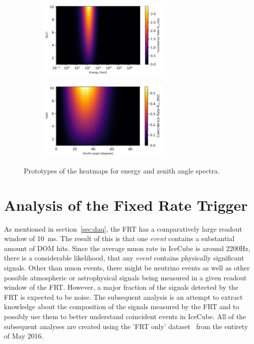 \begin{figure}[ht]
    \centering
    \begin{subfigure}[b]{\textwidth}
        \centering
        \includegraphics[width=0.7\textwidth]{Plots/heatmap_energy.png}
    \end{subfigure}
    \vspace{1em} %
    \begin{subfigure}[b]{\textwidth}
        \centering
        \includegraphics[width=0.7\textwidth]{Plots/heatmap_zenith.png}
    \end{subfigure}
    \caption{Prototypes of the heatmaps for energy and zenith angle spectra.}
    \label{fig:heatmaps_combined}
\end{figure}

\section{Analysis of the Fixed Rate Trigger}

As mentioned in section~\ref{sec:daq}, the FRT has a comparatively large readout window of \SI{10}{ms}. The result of this is that one \textit{event} contains 
a substantial amount of DOM hits. Since the average muon rate in IceCube is around \num{2200}\unit{Hz}, there is a considerable likelihood, that any \textit{event}
contains physically significant signals. Other than muon events, there might be neutrino events as well as other possible atmospheric or astrophysical signals 
being measured in a given readout window of the FRT. However, a major fraction of the signals detected by the FRT is expected to be noise. 
The subsequent analysis is an attempt to extract knowledge about the composition of the signals 
measured by the FRT and to possibly use them to better understand coincident events in IceCube. All of the subsequent analyses are created using the 'FRT only' dataset~\cite{IceCubeFRT} 
from the entirety of May 2016. \\

